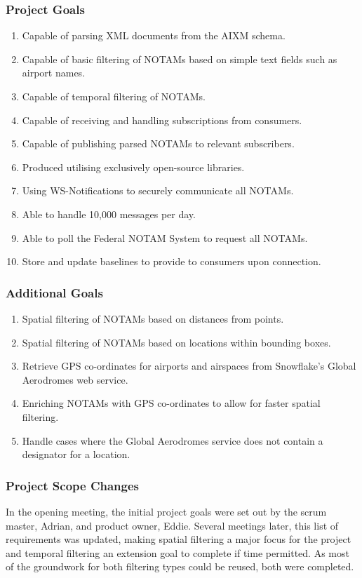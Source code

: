 \documentclass[a4paper, 12pt, twoside]{article}
\begin{document}
\subsubsection{Project Goals}
\begin{enumerate}
\item Capable of parsing XML documents from the AIXM schema.
\item Capable of basic filtering of NOTAMs based on simple text fields such as airport names.
\item Capable of temporal filtering of NOTAMs.
\item Capable of receiving and handling subscriptions from consumers.
\item Capable of publishing parsed NOTAMs to relevant subscribers.
\item Produced utilising exclusively open-source libraries.
\item Using WS-Notifications to securely communicate all NOTAMs.
\item Able to handle 10,000 messages per day.
\item Able to poll the Federal NOTAM System to request all NOTAMs.
\item Store and update baselines to provide to consumers upon connection.
\end{enumerate}

\subsubsection{Additional Goals}
\begin{enumerate}
\item Spatial filtering of NOTAMs based on distances from points.
\item Spatial filtering of NOTAMs based on locations within bounding boxes.
\item Retrieve GPS co-ordinates for airports and airspaces from Snowflake's Global Aerodromes web service.
\item Enriching NOTAMs with GPS co-ordinates to allow for faster spatial filtering.
\item Handle cases where the Global Aerodromes service does not contain a designator for a location.
\end{enumerate}

\subsubsection{Project Scope Changes}
In the opening meeting, the initial project goals were set out by the scrum master, Adrian, and product owner, Eddie. Several meetings later, this list of requirements was updated, making spatial filtering a major focus for the project and temporal filtering an extension goal to complete if time permitted. As most of the groundwork for both filtering types could be reused, both were completed.
\end{document}

